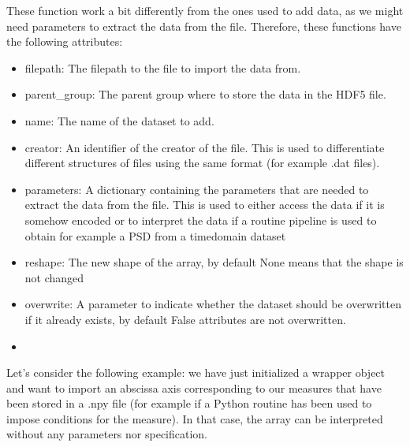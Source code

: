 \documentclass[letterpaper,10pt,english]{sphinxmanual}
\begin{document}
\sphinxAtStartPar
These function work a bit differently from the ones used to add data, as we might need parameters to extract the data from the file. Therefore, these functions have the following attributes:
\begin{itemize}
\item {} 
\sphinxAtStartPar
filepath: The filepath to the file to import the data from.

\item {} 
\sphinxAtStartPar
parent\_group: The parent group where to store the data in the HDF5 file.

\item {} 
\sphinxAtStartPar
name: The name of the dataset to add.

\item {} 
\sphinxAtStartPar
creator: An identifier of the creator of the file. This is used to differentiate different structures of files using the same format (for example .dat files).

\item {} 
\sphinxAtStartPar
parameters: A dictionary containing the parameters that are needed to extract the data from the file. This is used to either access the data if it is somehow encoded or to interpret the data if a routine pipeline is used to obtain for example a PSD from a time\sphinxhyphen{}domain dataset

\item {} 
\sphinxAtStartPar
reshape: The new shape of the array, by default None means that the shape is not changed

\item {} 
\sphinxAtStartPar
overwrite: A parameter to indicate whether the dataset should be overwritten if it already exists, by default False \sphinxhyphen{} attributes are not overwritten.

\item {} 
\sphinxAtStartPar
{}

\end{itemize}

\sphinxAtStartPar
{}
Let’s consider the following example: we have just initialized a wrapper object and want to import an abscissa axis corresponding to our measures that have been stored in a .npy file (for example if a Python routine has been used to impose conditions for the measure). In that case, the array can be interpreted without any parameters nor specification.
\end{document}
